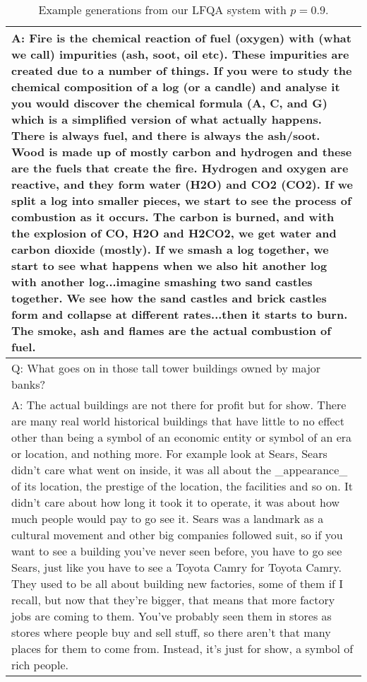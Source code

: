 \documentclass[11pt]{article}
\begin{document}
\begin{table*}[t]
\begin{tabular}{p{}}
  \midrule
  A: Fire is the chemical reaction of fuel (oxygen) with (what we call) impurities (ash, soot, oil etc). These impurities are created due to a number of things. If you were to study the chemical composition of a log (or a candle) and analyse it you would discover the chemical formula (A, C, and G) which is a simplified version of what actually happens. There is always fuel, and there is always the ash/soot. Wood is made up of mostly carbon and hydrogen and these are the fuels that create the fire. Hydrogen and oxygen are reactive, and they form water (H2O) and CO2 (CO2). If we split a log into smaller pieces, we start to see the process of combustion as it occurs. The carbon is burned, and with the explosion of CO, H2O and H2CO2, we get water and carbon dioxide (mostly). If we smash a log together, we start to see what happens when we also hit another log with another log...imagine smashing two sand castles together. We see how the sand castles and brick castles form and collapse at different rates...then it starts to burn. The smoke, ash and flames are the actual combustion of fuel. \\
  \midrule
  Q: What goes on in those tall tower buildings owned by major banks? \\
  \midrule
  A: The actual buildings are not there for profit but for show. There are many real world historical buildings that have little to no effect other than being a symbol of an economic entity or symbol of an era or location, and nothing more. For example look at Sears, Sears didn't care what went on inside, it was all about the \_appearance\_ of its location, the prestige of the location, the facilities and so on. It didn't care about how long it took it to operate, it was about how much people would pay to go see it. Sears was a landmark as a cultural movement and other big companies followed suit, so if you want to see a building you've never seen before, you have to go see Sears, just like you have to see a Toyota Camry for Toyota Camry. They used to be all about building new factories, some of them if I recall, but now that they're bigger, that means that more factory jobs are coming to them. You've probably seen them in stores as stores where people buy and sell stuff, so there aren't that many places for them to come from. Instead, it's just for show, a symbol of rich people.  \\
  \bottomrule
       \end{tabular}
\caption{Example generations from our LFQA system with \(p=0.9\).}
    \label{tab:generations_extra}
\end{table*}


 
\end{document}
